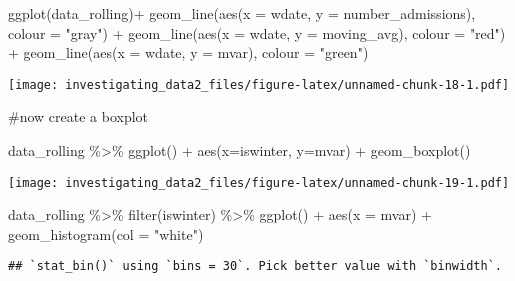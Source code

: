 \documentclass[
]{article}
\newenvironment{Shaded}{\begin{snugshade}}{\end{snugshade}}
\newcommand{\AttributeTok}[1]{\textcolor[rgb]{0.77,0.63,0.00}{#1}}
\newcommand{\FunctionTok}[1]{\textcolor[rgb]{0.00,0.00,0.00}{#1}}
\newcommand{\NormalTok}[1]{#1}
\newcommand{\SpecialCharTok}[1]{\textcolor[rgb]{0.00,0.00,0.00}{#1}}
\newcommand{\StringTok}[1]{\textcolor[rgb]{0.31,0.60,0.02}{#1}}
\begin{document}
\begin{Shaded}
\begin{Highlighting}[]
\FunctionTok{ggplot}\NormalTok{(data\_rolling)}\SpecialCharTok{+}
  \FunctionTok{geom\_line}\NormalTok{(}\FunctionTok{aes}\NormalTok{(}\AttributeTok{x =}\NormalTok{ wdate, }\AttributeTok{y =}\NormalTok{ number\_admissions), }\AttributeTok{colour =} \StringTok{"gray"}\NormalTok{) }\SpecialCharTok{+}
  \FunctionTok{geom\_line}\NormalTok{(}\FunctionTok{aes}\NormalTok{(}\AttributeTok{x =}\NormalTok{ wdate, }\AttributeTok{y =}\NormalTok{ moving\_avg), }\AttributeTok{colour =} \StringTok{"red"}\NormalTok{) }\SpecialCharTok{+}
  \FunctionTok{geom\_line}\NormalTok{(}\FunctionTok{aes}\NormalTok{(}\AttributeTok{x =}\NormalTok{ wdate, }\AttributeTok{y =}\NormalTok{ mvar), }\AttributeTok{colour =} \StringTok{"green"}\NormalTok{) }
\end{Highlighting}
\end{Shaded}

\texttt{[image: investigating\_data2\_files/figure-latex/unnamed-chunk-18-1.pdf]}

\#now create a boxplot

\begin{Shaded}
\begin{Highlighting}[]
\NormalTok{data\_rolling }\SpecialCharTok{\%\textgreater{}\%} 
  \FunctionTok{ggplot}\NormalTok{() }\SpecialCharTok{+}
  \FunctionTok{aes}\NormalTok{(}\AttributeTok{x=}\NormalTok{iswinter, }\AttributeTok{y=}\NormalTok{mvar) }\SpecialCharTok{+}
  \FunctionTok{geom\_boxplot}\NormalTok{()}
\end{Highlighting}
\end{Shaded}

\texttt{[image: investigating\_data2\_files/figure-latex/unnamed-chunk-19-1.pdf]}

\begin{Shaded}
\begin{Highlighting}[]
\NormalTok{data\_rolling }\SpecialCharTok{\%\textgreater{}\%} 
  \FunctionTok{filter}\NormalTok{(iswinter) }\SpecialCharTok{\%\textgreater{}\%} 
  \FunctionTok{ggplot}\NormalTok{() }\SpecialCharTok{+}
  \FunctionTok{aes}\NormalTok{(}\AttributeTok{x =}\NormalTok{ mvar) }\SpecialCharTok{+}
  \FunctionTok{geom\_histogram}\NormalTok{(}\AttributeTok{col =} \StringTok{"white"}\NormalTok{)}
\end{Highlighting}
\end{Shaded}

\begin{verbatim}
## `stat_bin()` using `bins = 30`. Pick better value with `binwidth`.
\end{verbatim}
\end{document}
